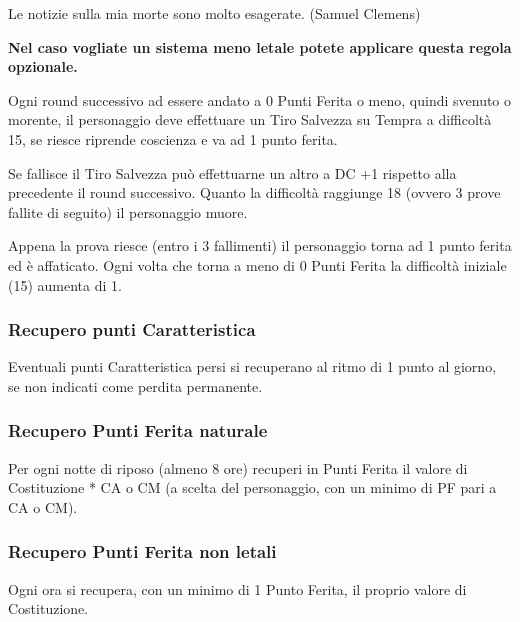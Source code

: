 \begin{multicols}{2}
\begin{enfasi}{
Le notizie sulla mia morte sono molto esagerate. (Samuel Clemens)
}\end{enfasi}

\textbf{Nel caso vogliate un sistema meno letale potete applicare questa regola opzionale.}

Ogni round successivo ad essere andato a 0 Punti Ferita o meno, quindi svenuto o morente, il personaggio deve effettuare un Tiro Salvezza su Tempra a difficoltà 15, se riesce riprende coscienza e va ad 1 punto ferita.

Se fallisce il Tiro Salvezza può effettuarne un altro a DC +1 rispetto alla precedente il round successivo. Quanto la difficoltà raggiunge 18 (ovvero 3 prove fallite di seguito) il personaggio muore.

Appena la prova riesce (entro i 3 fallimenti) il personaggio torna ad 1 punto ferita ed è affaticato. Ogni volta che torna a meno di 0 Punti Ferita la difficoltà iniziale (15) aumenta di 1.

\subsubsection{Recupero punti Caratteristica}\label{recuperopunticcaratteristica}

Eventuali punti Caratteristica persi si recuperano al ritmo di 1 punto al giorno, se non indicati come perdita permanente.

\subsubsection{Recupero Punti Ferita naturale}\label{recuperopuntiferitanaturale}

Per ogni notte di riposo (almeno 8 ore) recuperi in Punti Ferita il valore di Costituzione * CA o CM (a scelta del personaggio, con un minimo di PF pari a CA o CM).

\subsubsection{Recupero Punti Ferita non letali}\label{recuperopuntiferitanonletali}\hypertarget{recuperopuntiferitanonletali}{}

Ogni ora si recupera, con un minimo di 1 Punto Ferita, il proprio valore di Costituzione.


\end{multicols}
